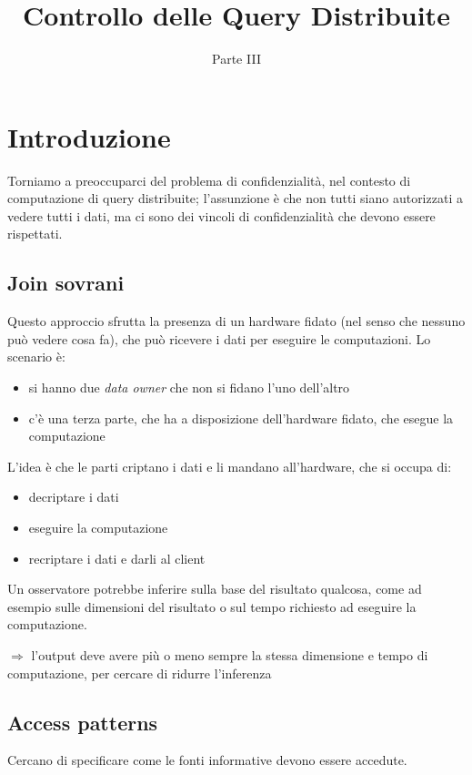 \documentclass{report}
\title{\huge\textbf{{Controllo delle Query Distribuite}}}
\date{Parte III}
\begin{document}
\maketitle
\tableofcontents
\newpage


\chapter{Introduzione}

Torniamo a preoccuparci del problema di confidenzialità, nel contesto di computazione di 
query distribuite; l'assunzione è che non tutti siano autorizzati a vedere tutti i dati, ma ci 
sono dei vincoli di confidenzialità che devono essere rispettati.

\section{Join sovrani}
Questo approccio sfrutta la presenza di un hardware fidato (nel senso che nessuno può vedere 
cosa fa), che può ricevere i dati 
per eseguire le computazioni. Lo scenario è:
\begin{itemize}
    \item si hanno due \textit{data owner} che non si fidano l'uno dell'altro
    \item c'è una terza parte, che ha a disposizione dell'hardware fidato, che esegue la computazione
\end{itemize}

\noindent L'idea è che le parti criptano i dati e li mandano all'hardware, che si occupa di:
\begin{itemize}
    \item decriptare i dati 
    \item eseguire la computazione 
    \item recriptare i dati e darli al client 
\end{itemize}

\noindent Un osservatore potrebbe inferire sulla base del risultato qualcosa, come ad esempio 
sulle dimensioni del risultato o sul tempo richiesto ad eseguire la computazione.

\noindent $\Rightarrow$ l'output deve avere più o meno sempre la stessa dimensione e tempo di computazione, 
per cercare di ridurre l'inferenza

\section{Access patterns}
Cercano di specificare come le fonti informative devono essere accedute.
\end{document}

